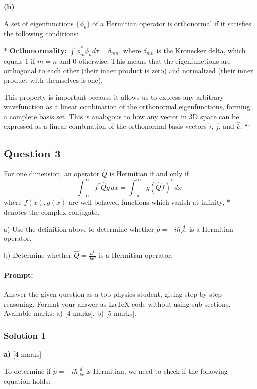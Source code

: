 \documentclass{article}
\begin{document}
\textbf{(b)} 

A set of eigenfunctions $\{\phi_n\}$ of a Hermitian operator is orthonormal if it satisfies the following conditions:

* \textbf{Orthonormality:} $\int \phi_m^* \phi_n d\tau = \delta_{mn}$, where $\delta_{mn}$ is the Kronecker delta, which equals 1 if $m=n$ and 0 otherwise. This means that the eigenfunctions are orthogonal to each other (their inner product is zero) and normalized (their inner product with themselves is one).

This property is important because it allows us to express any arbitrary wavefunction as a linear combination of the orthonormal eigenfunctions, forming a complete basis set. This is analogous to how any vector in 3D space can be expressed as a linear combination of the orthonormal basis vectors $\hat{i}$, $\hat{j}$, and $\hat{k}$.
```

\subsection{Question 3} 

For one dimension, an operator $\hat{Q}$ is Hermitian if and only if
\[
\int_{-\infty}^{\infty} f^* \hat{Q} g \, dx = \int_{-\infty}^{\infty} g (\hat{Q} f)^* \, dx
\]
where $f(x), g(x)$ are well-behaved functions which vanish at infinity, $*$ denotes the complex conjugate.

a) Use the definition above to determine whether $\hat{p} = -i\hbar \frac{d}{dx}$ is a Hermitian operator.

b) Determine whether $\hat{Q} = \frac{d^2}{dx^2}$ is a Hermitian operator.

\paragraph{Prompt: \\} 
Answer the given question as a top physics student, giving step-by-step reasoning. Format your answer as LaTeX code without using sub-sections. Available marks: a) [4 marks], b) [5 marks].

\subsubsection{Solution 1}
\textbf{a)} [4 marks]

To determine if $\hat{p} = -i\hbar \frac{d}{dx}$ is Hermitian, we need to check if the following equation holds:
\end{document}
